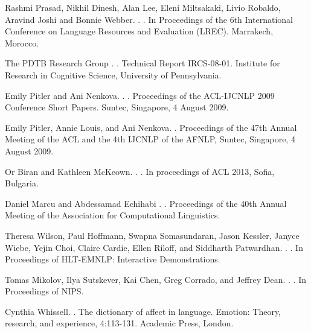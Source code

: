 \documentclass[11pt,letterpaper]{article}
\begin{document}
\begin{thebibliography}{}
Rashmi Prasad, Nikhil Dinesh, Alan Lee, Eleni Miltsakaki, Livio Robaldo, Aravind Joshi and Bonnie Webber. 
.
. 
\newblock In Proceedings of the 6th International Conference on Language Resources and Evaluation (LREC). Marrakech, Morocco.

The PDTB Research Group
.
.
\newblock Technical Report IRCS-08-01. Institute for Research in Cognitive Science, University of Pennsylvania.

Emily Pitler and Ani Nenkova.
.
.
\newblock Proceedings of the ACL-IJCNLP 2009 Conference Short Papers.  Suntec, Singapore, 4 August 2009.

Emily Pitler, Annie Louis, and Ani Nenkova.
.
\newblock Proceedings of the 47th Annual Meeting of the ACL and the 4th IJCNLP of the AFNLP, Suntec, Singapore, 4 August 2009.

Or Biran and Kathleen McKeown. 
.
.
\newblock  In proceedings of ACL 2013, Sofia, Bulgaria.

Daniel Marcu and Abdessamad Echihabi
.
.
\newblock Proceedings of the 40th Annual Meeting of the Association for Computational Linguistics.

Theresa Wilson, Paul Hoffmann, Swapna Somasundaran, Jason Kessler, Janyce Wiebe, Yejin Choi, Claire Cardie, Ellen Riloff, and Siddharth Patwardhan. 
.
.
\newblock In Proceedings of HLT-EMNLP: Interactive Demonstrations.

Tomas Mikolov, Ilya Sutskever, Kai Chen, Greg Corrado, and Jeffrey Dean. 
.
. 
\newblock In Proceedings of NIPS.

Cynthia Whissell. 
. 
\newblock The dictionary of affect in language. 
\newblock Emotion: Theory, research, and experience, 4:113-131. Academic Press, London.

\end{thebibliography}
\end{document}
